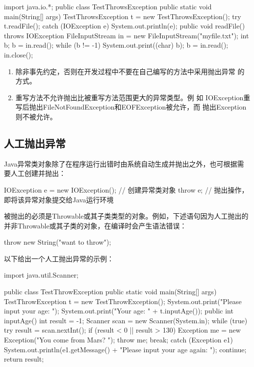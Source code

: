 
\begin{javaCode}
import java.io.*;
public class TestThrowsException {
  public static void main(String[] args) {
    TestThrowsException t = new TestThrowsException();
    try {
      t.readFile();
    } catch (IOException e) {
      System.out.println(e);
    }
  }
  public void readFile() throws IOException {
    FileInputStream in = new FileInputStream("myfile.txt");
    int b;
    b = in.read();
    while (b != -1) {
      System.out.print((char) b);
      b = in.read();
    }
    in.close();
  }
}
\end{javaCode}
 

\begin{enumerate}
\item 除非事先约定，否则在开发过程中不要在自己编写的方法中采用抛出异常
  的方式。
\item 重写方法不允许抛出比被重写方法范围更大的异常类型。例
  如 IOException重写后抛出FileNotFoundException和EOFException被允许，而
  抛出Exception则不被允许。
\end{enumerate}
 
\subsection{人工抛出异常}

Java异常类对象除了在程序运行出错时由系统自动生成并抛出之外，也可根据需
要人工创建并抛出：

\begin{javaCode}
IOException e = new IOException(); // 创建异常类对象
throw e; // 抛出操作，即将该异常对象提交给Java运行环境
\end{javaCode}

被抛出的必须是Throwable或其子类类型的对象。例如，下述语句因为人工抛出的
并非Throwable或其子类的对象，在编译时会产生语法错误：

\begin{javaCode}
throw new String("want to throw");  
\end{javaCode}

以下给出一个人工抛出异常的示例：


\begin{javaCode}
import java.util.Scanner;

public class TestThrowException {
  public static void main(String[] args) {
    TestThrowException t = new TestThrowException();
    System.out.print("Please input your age: ");
    System.out.print("Your age: " + t.inputAge());
  }
  public int inputAge() {
    int result = -1;
    Scanner scan = new Scanner(System.in);
    while (true) {
      try {
        result = scan.nextInt();
        if (result < 0 || result > 130) {
          Exception me = new Exception("You come from Mars? ");
          throw me;
        }
        break;
      } catch (Exception e1) {
        System.out.println(e1.getMessage() + "Please input your age again: ");
        continue;
      }
    }
    return result;
  }
}
\end{javaCode}

